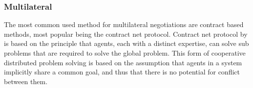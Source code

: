 
\subsubsection{Multilateral}
\label{sec:lit:neg:multilateral}
The most common used method for multilateral negotiations are contract based methods, most popular being the contract net protocol. Contract net protocol by \citet{smith1980communication} is based on the principle that agents, each with a distinct expertise, can solve sub problems that are required to solve the global problem. This form of cooperative distributed problem solving is based on the assumption that agents in a system implicitly share a common goal, and thus that there is no potential for conflict between them.

